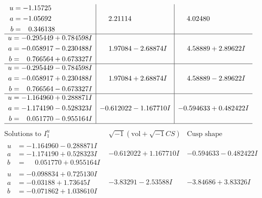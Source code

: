 \documentclass[1p]{elsarticle_modified}
\theoremstyle{definition}
\newcommand{\I}{\sqrt{-1}}
\begin{document}
$$\begin{array}{c|c|c}
\begin{aligned}
u &= -1.15725\phantom{ +0.000000I} \\
a &= -1.05692\phantom{ +0.000000I} \\
b &= \phantom{-}0.346138\phantom{ +0.000000I}\end{aligned}
 & \phantom{-}2.21114\phantom{ +0.000000I} & \phantom{-}4.02480\phantom{ +0.000000I} \\ \hline\begin{aligned}
u &= -0.295449 + 0.784598 I \\
a &= -0.058917 - 0.230488 I \\
b &= \phantom{-}0.766564 + 0.673327 I\end{aligned}
 & \phantom{-}1.97084 - 2.68874 I & \phantom{-}4.58889 + 2.89622 I \\ \hline\begin{aligned}
u &= -0.295449 - 0.784598 I \\
a &= -0.058917 + 0.230488 I \\
b &= \phantom{-}0.766564 - 0.673327 I\end{aligned}
 & \phantom{-}1.97084 + 2.68874 I & \phantom{-}4.58889 - 2.89622 I \\ \hline\begin{aligned}
u &= -1.164960 + 0.288871 I \\
a &= -1.174190 - 0.528323 I \\
b &= \phantom{-}0.051770 - 0.955164 I\end{aligned}
 & -0.612022 - 1.167710 I & -0.594633 + 0.482422 I\\
 \hline 
 \end{array}$$\newpage$$\begin{array}{c|c|c}  
\text{Solutions to }I^u_{1}& \I (\text{vol} + \sqrt{-1}CS) & \text{Cusp shape}\\
 \hline 
\begin{aligned}
u &= -1.164960 - 0.288871 I \\
a &= -1.174190 + 0.528323 I \\
b &= \phantom{-}0.051770 + 0.955164 I\end{aligned}
 & -0.612022 + 1.167710 I & -0.594633 - 0.482422 I \\ \hline\begin{aligned}
u &= -0.098834 + 0.725130 I \\
a &= -0.03188 + 1.73645 I \\
b &= -0.071862 + 1.038610 I\end{aligned}
 & -3.83291 - 2.53588 I & -3.84686 + 3.83326 I \\ \hline\begin{aligned}

\end{aligned}
\end{array}$$
\end{document}

